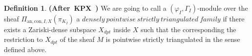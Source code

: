 \documentclass[12pt]{amsart}
\newtheorem{lemma}[theorem]{Lemma}
\theoremstyle{definition}
\newtheorem{definition}[theorem]{Definition}
\numberwithin{equation}{section}
\begin{document}
\begin{definition} \mbox{\bf{(After KPX \cite[Definition 6.3.2]{KPX})}}
We are going to call a $(\varphi_I,\Gamma_I)$-module over the sheaf $\Pi_{\mathrm{an},\mathrm{con},I,X}(\pi_{K_I})$ a $densely~pointwise~strictly~triangulated~family$ if there exists a Zariski-dense subspace $X_{dpt}$ inside $X$ such that the corresponding the restriction to $X_{dpt}$ of the sheaf $M$ is pointwise strictly triangulated in the sense defined above.	
\end{definition}




%
%
%
%
%
%
\end{document}
